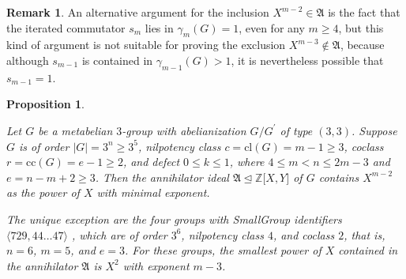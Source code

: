 \documentclass{amsart}
\newtheorem{proposition}{Proposition}[section]
\theoremstyle{definition}
\newtheorem{remark}{Remark}[section]
\numberwithin{equation}{section}
\begin{document}
\begin{remark}
\label{rmk:LowPowX}
An alternative argument for the inclusion \(X^{m-2}\in\mathfrak{A}\) is the fact that
the iterated commutator \(s_m\) lies in \(\gamma_m(G)=1\), even for any \(m\ge 4\),
but this kind of argument is not suitable for proving the exclusion \(X^{m-3}\not\in\mathfrak{A}\),
because although \(s_{m-1}\) is contained in \(\gamma_{m-1}(G)>1\), it is nevertheless possible that \(s_{m-1}=1\).
\end{remark}

\begin{proposition}
\label{prp:LowPowX}

Let \(G\) be a metabelian \(3\)-group with abelianization \(G/G^\prime\) of type \((3,3)\).
Suppose \(G\) is of order \(\lvert G\rvert=3^n\ge 3^5\), nilpotency class \(c=\mathrm{cl}(G)=m-1\ge 3\), coclass \(r=\mathrm{cc}(G)=e-1\ge 2\),
and defect \(0\le k\le 1\), where \(4\le m<n\le 2m-3\) and \(e=n-m+2\ge 3\).
Then the annihilator ideal \(\mathfrak{A}\unlhd\mathbb{Z}\lbrack X,Y\rbrack\) of \(G\)
contains \(X^{m-2}\) as the power of \(X\) with minimal exponent.

The unique exception are the four groups with SmallGroup identifiers \(\langle 729,44\ldots 47\rangle\)
\cite{BEO1,BEO2},
which are of order \(3^6\), nilpotency class \(4\), and coclass \(2\),
that is, \(n=6\), \(m=5\), and \(e=3\).
For these groups, the smallest power of \(X\) contained in the annihilator \(\mathfrak{A}\) is \(X^2\) with exponent \(m-3\).

\end{proposition}
\end{document}
